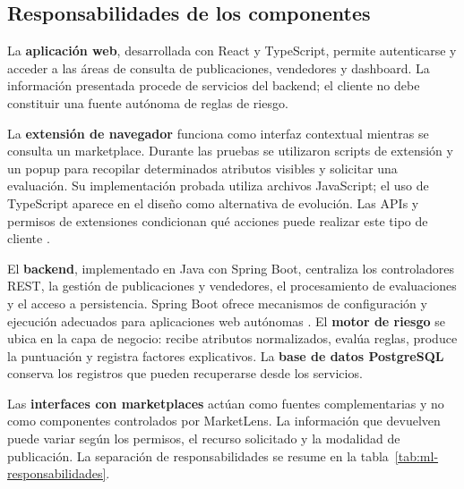 \subsection{Responsabilidades de los componentes}\label{subsec:ml-componentes}

La \textbf{aplicación web}, desarrollada con React y TypeScript, permite autenticarse y acceder a las áreas de consulta de publicaciones, vendedores y dashboard. La información presentada procede de servicios del backend; el cliente no debe constituir una fuente autónoma de reglas de riesgo.

La \textbf{extensión de navegador} funciona como interfaz contextual mientras se consulta un marketplace. Durante las pruebas se utilizaron scripts de extensión y un popup para recopilar determinados atributos visibles y solicitar una evaluación. Su implementación probada utiliza archivos JavaScript; el uso de TypeScript aparece en el diseño como alternativa de evolución. Las APIs y permisos de extensiones condicionan qué acciones puede realizar este tipo de cliente \citep{ml-mdn-webextensions}.

El \textbf{backend}, implementado en Java con Spring Boot, centraliza los controladores REST, la gestión de publicaciones y vendedores, el procesamiento de evaluaciones y el acceso a persistencia. Spring Boot ofrece mecanismos de configuración y ejecución adecuados para aplicaciones web autónomas \citep{ml-spring-boot-docs}. El \textbf{motor de riesgo} se ubica en la capa de negocio: recibe atributos normalizados, evalúa reglas, produce la puntuación y registra factores explicativos. La \textbf{base de datos PostgreSQL} conserva los registros que pueden recuperarse desde los servicios.

Las \textbf{interfaces con marketplaces} actúan como fuentes complementarias y no como componentes controlados por MarketLens. La información que devuelven puede variar según los permisos, el recurso solicitado y la modalidad de publicación. La separación de responsabilidades se resume en la tabla~\ref{tab:ml-responsabilidades}.

